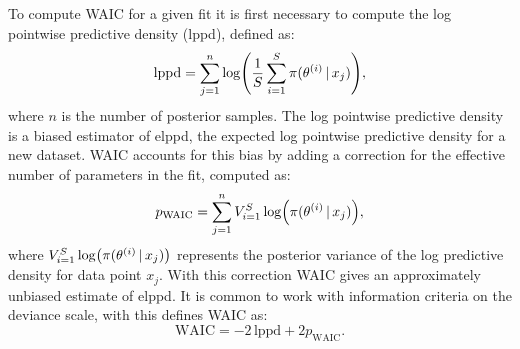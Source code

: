To compute WAIC for a given fit it is first necessary to compute the log pointwise
predictive density (lppd), defined as:
\begin{equation*}
  \text{lppd} = \sum_{j=1}^n \log(\frac{1}{S} \sum_{i=1}^S \pi(\theta^{(i)} \,|\, x_j)),
\end{equation*}
where $n$ is the number of posterior samples. The log pointwise predictive density is a
biased estimator of elppd, the expected log pointwise predictive density for a new
dataset.  WAIC accounts for this bias by adding a correction for the effective number of
parameters in the fit, computed as:
\begin{equation*}
    p_{\text{WAIC}} = \sum_{j=1}^n V_{i=1}^{S}\log(\pi(\theta^{(i)} \,|\, x_j)),
\end{equation*}
where $V_{i=1}^{S}\log(\pi(\theta^{(i)} \,|\, x_j))$ represents the posterior variance of
the log predictive density for data point $x_j$. With this correction WAIC gives an
approximately unbiased estimate of elppd. It is common to work with information criteria
on the deviance scale, with this \textcite{watanabe09} defines WAIC as:
\begin{equation*}
    \text{WAIC} = -2\,\text{lppd} +2p_{\text{WAIC}}.
\end{equation*}

